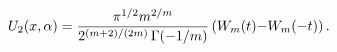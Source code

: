 \[U_{2}(x,\alpha)=\frac{\pi^{1/2}m^{2/m}}{2^{(m+2)/(2m)}\mathop{\Gamma\/}%
\nolimits\!\left(-1/m\right)}\left(W_{m}(t){-}W_{m}(-t)\right).\]